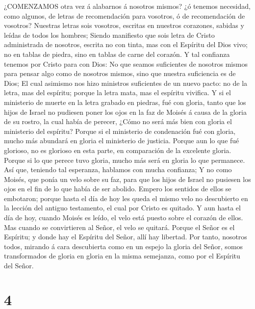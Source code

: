  ¿COMENZAMOS otra vez á alabarnos á nosotros mismos? ¿ó
tenemos necesidad, como algunos, de letras de recomendación para
vosotros, ó de recomendación de vosotros?  Nuestras letras
sois vosotros, escritas en nuestros corazones, sabidas y leídas de todos
los hombres;  Siendo manifiesto que sois letra de Cristo
administrada de nosotros, escrita no con tinta, mas con el Espíritu del
Dios vivo; no en tablas de piedra, sino en tablas de carne del corazón.
 Y tal confianza tenemos por Cristo para con Dios:
 No que seamos suficientes de nosotros mismos para pensar
algo como de nosotros mismos, sino que nuestra suficiencia es de Dios;
 El cual asimismo nos hizo ministros suficientes de un nuevo
pacto: no de la letra, mas del espíritu; porque la letra mata, mas el
espíritu vivifica.  Y si el ministerio de muerte en la letra
grabado en piedras, fué con gloria, tanto que los hijos de Israel no
pudiesen poner los ojos en la faz de Moisés á causa de la gloria de su
rostro, la cual había de perecer,  ¿Cómo no será más bien
con gloria el ministerio del espíritu?  Porque si el
ministerio de condenación fué con gloria, mucho más abundará en gloria
el ministerio de justicia.  Porque aun lo que fué glorioso,
no es glorioso en esta parte, en comparación de la excelente gloria.
 Porque si lo que perece tuvo gloria, mucho más será en
gloria lo que permanece.  Así que, teniendo tal esperanza,
hablamos con mucha confianza;  Y no como Moisés, que ponía
un velo sobre su faz, para que los hijos de Israel no pusiesen los ojos
en el fin de lo que había de ser abolido.  Empero los
sentidos de ellos se embotaron; porque hasta el día de hoy les queda el
mismo velo no descubierto en la lección del antiguo testamento, el cual
por Cristo es quitado.  Y aun hasta el día de hoy, cuando
Moisés es leído, el velo está puesto sobre el corazón de ellos.
 Mas cuando se convirtieren al Señor, el velo se quitará.
 Porque el Señor es el Espíritu; y donde hay el Espíritu
del Señor, allí hay libertad.  Por tanto, nosotros todos,
mirando á cara descubierta como en un espejo la gloria del Señor, somos
transformados de gloria en gloria en la misma semejanza, como por el
Espíritu del Señor.

\hypertarget{section-3}{%
\section{4}\label{section-3}}

